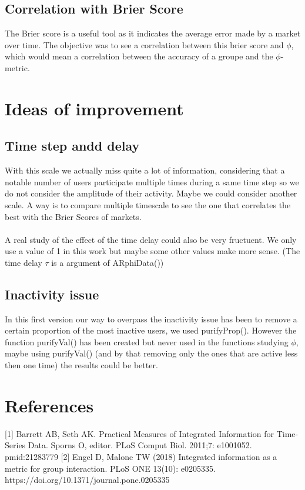 \documentclass{report}
\begin{document}
\section{Correlation with Brier Score}

The Brier score is a useful tool as it indicates the average error made by a market over time. The objective was to see a correlation between this brier score and $\phi $, which would mean a correlation between the accuracy of a groupe and the $\phi $-metric.


\chapter{Ideas of improvement}

\section{Time step andd delay}
With this scale we actually miss quite a lot of information, considering that a notable number of users participate multiple times during a same time step so we do not consider the amplitude of their activity. Maybe we could consider another scale. A way is to compare multiple timescale to see the one that correlates the best with the Brier Scores of markets.\\
\\
A real study of the effect of the time delay could also be very fructuent. We only use a value of 1 in this work but maybe some other values make more sense. (The time delay $\tau$ is a argument of ARphiData())

\section{Inactivity issue}

In this first version our way to overpass the inactivity issue has been to remove a certain proportion of the most inactive users, we used purifyProp(). However the function purifyVal() has been created but never used in the functions studying $\phi $, maybe using purifyVal() (and by that removing only the ones that are active less then one time) the results could be better.

\chapter{References}

[1] Barrett AB, Seth AK. Practical Measures of Integrated Information for Time-Series Data. Sporns O, editor. PLoS Comput Biol. 2011;7: e1001052. pmid:21283779
[2] Engel D, Malone TW (2018) Integrated information as a metric for group interaction. PLoS ONE 13(10): e0205335. https://doi.org/10.1371/journal.pone.0205335






\tableofcontents
 
\end{document}
